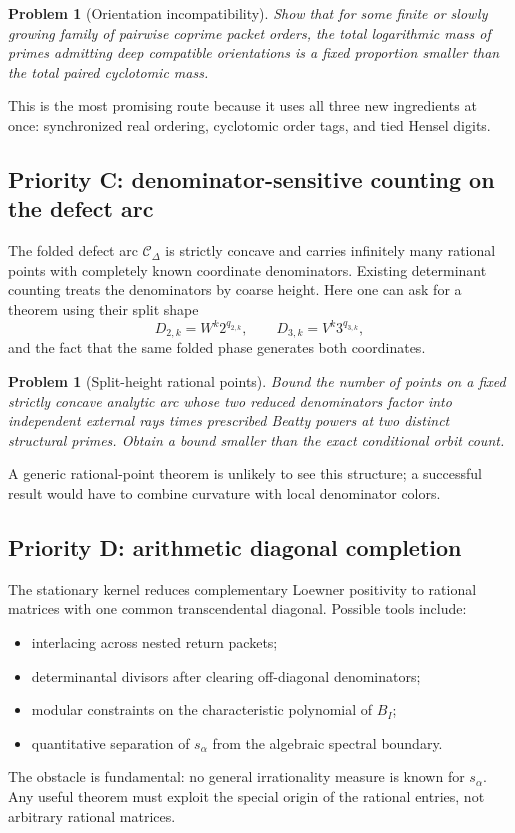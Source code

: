 \documentclass[11pt]{article}
\newtheorem{problem}[theorem]{Problem}
\theoremstyle{definition}
\theoremstyle{remark}
\begin{document}
\begin{problem}[Orientation incompatibility]\label{prob:orientation-incompat}
Show that for some finite or slowly growing family of pairwise coprime packet orders, the total logarithmic mass of primes admitting deep compatible orientations is a fixed proportion smaller than the total paired cyclotomic mass.
\end{problem}

This is the most promising route because it uses all three new ingredients at once: synchronized real ordering, cyclotomic order tags, and tied Hensel digits.

\subsection{Priority C: denominator-sensitive counting on the defect arc}

The folded defect arc $\mathcal C_\Delta$ is strictly concave and carries infinitely many rational points with completely known coordinate denominators.  Existing determinant counting treats the denominators by coarse height.  Here one can ask for a theorem using their split shape
\begin{equation}\label{eq:split-den-shape}
 D_{2,k}=W^k2^{q_{2,k}},
 \qquad
 D_{3,k}=V^k3^{q_{3,k}},
\end{equation}
and the fact that the same folded phase generates both coordinates.

\begin{problem}[Split-height rational points]\label{prob:split-height}
Bound the number of points on a fixed strictly concave analytic arc whose two reduced denominators factor into independent external rays times prescribed Beatty powers at two distinct structural primes.  Obtain a bound smaller than the exact conditional orbit count.
\end{problem}

A generic rational-point theorem is unlikely to see this structure; a successful result would have to combine curvature with local denominator colors.

\subsection{Priority D: arithmetic diagonal completion}

The stationary kernel reduces complementary Loewner positivity to rational matrices with one common transcendental diagonal.  Possible tools include:
\begin{itemize}
\item interlacing across nested return packets;
\item determinantal divisors after clearing off-diagonal denominators;
\item modular constraints on the characteristic polynomial of $B_I$;
\item quantitative separation of $s_\alpha$ from the algebraic spectral boundary.
\end{itemize}
The obstacle is fundamental: no general irrationality measure is known for $s_\alpha$.  Any useful theorem must exploit the special origin of the rational entries, not arbitrary rational matrices.
\end{document}
